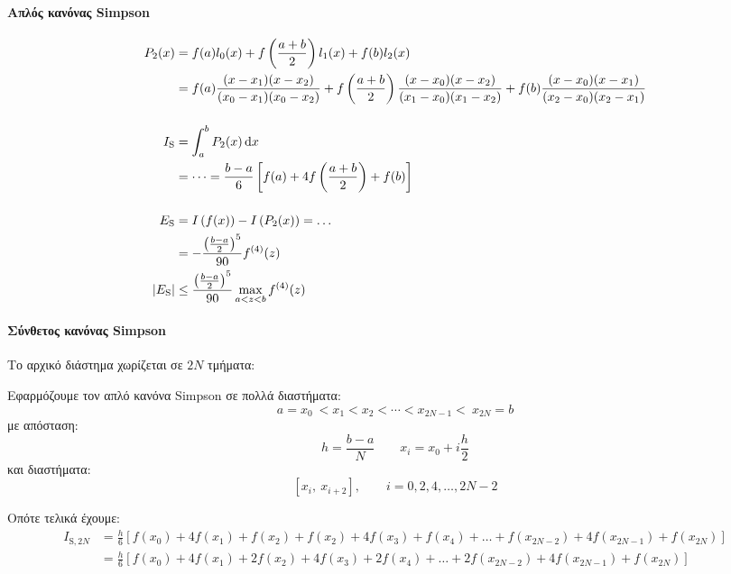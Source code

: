 \documentclass[11pt,a4paper,notitlepage,fleqn,final]{article}
\begin{document}
    \paragraph{Απλός κανόνας Simpson}
    \begin{align*}
    	P_2(x) &= f(a)l_0(x) +f\left(\frac{a+b}{2}\right)l_1(x)+f(b)
    	l_2(x) \\ &= f(a) \frac{(x-x_1)(x-x_2)}{(x_0-x_1)(x_0-x_2)}
    	+ f\left(\frac{a+b}{2}\right)
    	\frac{(x-x_0)(x-x_2)}{(x_1-x_0)(x_1-x_2)}
    	+ f(b) \frac{(x-x_0)(x-x_1)}{(x_2-x_0)(x_2-x_1)}
    	\\[3ex]
    	I_{\mathrm S} &= \int_a^b P_2(x)\mathop{}\!\mathrm{d} x
    	\\ &= \dots = \frac{b-a}{6} \left[
    	f(a)+4f\left(\frac{a+b}{2}\right)+f(b) \right] \\[3ex]
    	E_{\mathrm S} &= I\left(f(x)\right)-I\left(P_2(x)\right) = \dots
    	\\ &= -\frac{\left(\frac{b-a}{2}\right)^5}{90} f^{(4)}(z) \\
    	\left|E_{\mathrm S}\right| &\leq
    	\frac{\left(\frac{b-a}{2}\right)^5}{90}\max_{a<z<b}f^{(4)}(z)
    \end{align*}

    \paragraph{Σύνθετος κανόνας Simpson}
    Το αρχικό διάστημα χωρίζεται σε \( 2N \) τμήματα:


    Εφαρμόζουμε τον απλό κανόνα Simpson σε πολλά διαστήματα:
    \[
    a = x_0 \ < x_1 < x_2 < \cdots < x_{2N-1} < \ x_{2N} = b
    \]
    με απόσταση:
    \[
    h = \frac{b-a}{N} \qquad x_i = x_0 + i\frac{h}{2}
    \]
    και διαστήματα:
    \[
    \left[x_i,\ x_{i+2}\right], \qquad i=0,2,4,\dots,2N-2
    \]

    Οπότε τελικά έχουμε: \begin{align*}
    	I_{\mathrm S,2N} &= \frac{h}{6} \left[f(x_0)+4f(x_1)+f(x_2)
    	+f(x_2)+4f(x_3)+f(x_4)+\dots + f(x_{2N-2}) + 4f(x_{2N-1})
    	+f(x_{2N})\right] \\ &=
    	\frac{h}{6} \left[f(x_0)+4f(x_1)+2f(x_2)+4f(x_3)+2f(x_4)+\dots
    	+ 2f(x_{2N-2}) + 4f(x_{2N-1})+f(x_{2N})\right]
    \end{align*}
\end{document}
